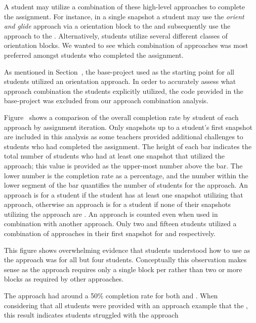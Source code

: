 A student may utilize a combination of these high-level approaches to complete
the assignment. For instance, in a single snapshot a student may use the
\emph{orient and glide} approach via a \rel{} orientation block to \catch{} the
\bear{} and subsequently use the \glideto{} approach to \catch{} the
\horse{}. Alternatively, students utilize several different classes of
orientation blocks. We wanted to see which combination of approaches was most
preferred amongst students who completed the assignment.

As mentioned in Section~, the base-project used as the
starting point for all students utilized an \abs{} orientation approach. In
order to accurately assess what approach combination the students explicitly
utilized, the code provided in the base-project was excluded from our approach
combination analysis.

Figure~ shows a comparison of the
overall completion rate by student of each approach by assignment
iteration. Only snapshots up to a student's first \com{} snapshot are included
in this analysis as some teachers provided additional challenges to students
who had completed the assignment. The height of each bar indicates the total
number of students who had at least one snapshot that utilized the approach;
this value is provided as the upper-most number above the bar. The lower number
is the completion rate as a percentage, and the number within the lower segment
of the bar quantifies the number of \com{} students for the approach. An
approach is \com{} for a student if the student has at least one \com{}
snapshot utilizing that approach, otherwise an approach is \incom{} for a
student if none of their snapshots utilizing the approach are \com{}. An
approach is counted even when used in combination with another approach. Only
two and fifteen students utilized a combination of approaches in their first
\com{} snapshot for \sone{} and \stwo{} respectively.

This figure shows overwhelming evidence that students understood how to use
\glideto{} as the approach was \com{} for all but four students. Conceptually
this observation makes sense as the approach requires only a single block per
\catch{} rather than two or more blocks as required by other approaches.

The \abs{} approach had around a 50\% completion rate for both \sone{} and
\stwo{}. When considering that all students were provided with an \abs{}
approach example that  the \zebra{}, this result indicates students
struggled with the \abs{} approach


